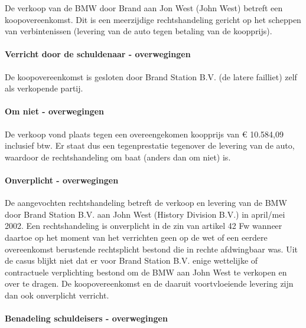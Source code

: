 \documentclass[
  dutch,
  a4paper,
]{article}
\begin{document}
De verkoop van de BMW door Brand aan Jon West (John West) betreft een koopovereenkomst. Dit is een meerzijdige rechtshandeling gericht op het scheppen van verbintenissen (levering van de auto tegen betaling van de koopprijs).

\paragraph{Verricht door de schuldenaar - overwegingen}\label{verricht-door-de-schuldenaar---overwegingen-62}

De koopovereenkomst is gesloten door Brand Station B.V. (de latere failliet) zelf als verkopende partij.

\paragraph{Om niet - overwegingen}\label{om-niet---overwegingen-62}

De verkoop vond plaats tegen een overeengekomen koopprijs van € 10.584,09 inclusief btw. Er staat dus een tegenprestatie tegenover de levering van de auto, waardoor de rechtshandeling om baat (anders dan om niet) is.

\paragraph{Onverplicht - overwegingen}\label{onverplicht---overwegingen-62}

De aangevochten rechtshandeling betreft de verkoop en levering van de BMW door Brand Station B.V. aan John West (History Division B.V.) in april/mei 2002. Een rechtshandeling is onverplicht in de zin van artikel 42 Fw wanneer daartoe op het moment van het verrichten geen op de wet of een eerdere overeenkomst berustende rechtsplicht bestond die in rechte afdwingbaar was. Uit de casus blijkt niet dat er voor Brand Station B.V. enige wettelijke of contractuele verplichting bestond om de BMW aan John West te verkopen en over te dragen. De koopovereenkomst en de daaruit voortvloeiende levering zijn dan ook onverplicht verricht.

\paragraph{Benadeling schuldeisers - overwegingen}\label{benadeling-schuldeisers---overwegingen-62}
\end{document}
